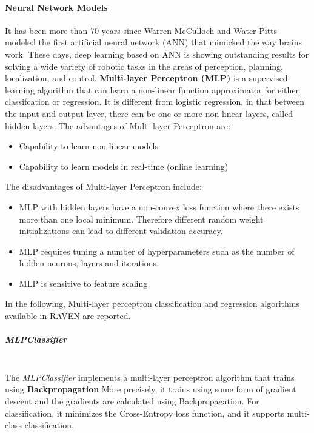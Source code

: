 \paragraph{Neural Network Models}
\label{DNN}
It has been more than 70 years since Warren McCulloch and Water Pitts modeled the first
artificial neural network (ANN) that mimicked the way brains work. These days, deep learning
based on ANN is showing outstanding results for solving a wide variety of robotic tasks in
the areas of perception, planning, localization, and control.
%
\textbf{Multi-layer Perceptron (MLP)} is a supervised learning algorithm that can learn
a non-linear function approximator for either classifcation or regression. It is different
from logistic regression, in that between the input and output layer, there can be one
or more non-linear layers, called hidden layers.
%
The advantages of Multi-layer Perceptron are:
\begin{itemize}
  \item Capability to learn non-linear models
  \item Capability to learn models in real-time (online learning)
\end{itemize}
The disadvantages of Multi-layer Perceptron include:
\begin{itemize}
  \item MLP with hidden layers have a non-convex loss function where there exists more than
    one local minimum. Therefore different random weight initializations can lead to different
    validation accuracy.
  \item MLP requires tuning a number of hyperparameters such as the number of hidden neurons, layers
    and iterations.
  \item MLP is sensitive to feature scaling
\end{itemize}


In the following, Multi-layer perceptron classification and regression algorithms available in RAVEN are reported.

\subparagraph{MLPClassifier}
\mbox{}
\\The \textit{MLPClassifier} implements a multi-layer perceptron algorithm that trains using \textbf{Backpropagation}
More precisely, it trains using some form of gradient descent and the gradients are calculated using Backpropagation.
For classification, it minimizes the Cross-Entropy loss function, and it supports multi-class classification.

